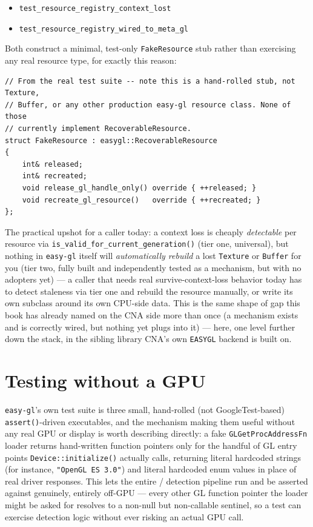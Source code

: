 \begin{itemize}
  \item \texttt{test\_resource\_registry\_context\_lost}
  \item \texttt{test\_resource\_registry\_wired\_to\_meta\_gl}
\end{itemize}

Both construct a minimal, test-only \texttt{FakeResource} stub rather than exercising any
real resource type, for exactly this reason:

\begin{lstlisting}
// From the real test suite -- note this is a hand-rolled stub, not Texture,
// Buffer, or any other production easy-gl resource class. None of those
// currently implement RecoverableResource.
struct FakeResource : easygl::RecoverableResource
{
    int& released;
    int& recreated;
    void release_gl_handle_only() override { ++released; }
    void recreate_gl_resource()   override { ++recreated; }
};
\end{lstlisting}

The practical upshot for a caller today: a context loss is cheaply \emph{detectable} per
resource via \texttt{is\_valid\_for\_current\_generation()} (tier one, universal), but nothing
in \texttt{easy-gl} itself will \emph{automatically rebuild} a lost \texttt{Texture} or
\texttt{Buffer} for you (tier two, fully built and independently tested as a mechanism, but with
no adopters yet) --- a caller that needs real survive-context-loss behavior today has to detect
staleness via tier one and rebuild the resource manually, or write its own
 subclass around its own CPU-side data. This is the same shape of
gap this book has already named on the CNA side more than once (a mechanism exists and is
correctly wired, but nothing yet plugs into it) --- here, one level further down the stack, in
the sibling library CNA's own \texttt{EASYGL} backend is built on.

\section{Testing without a GPU}

\texttt{easy-gl}'s own test suite is three small, hand-rolled (not GoogleTest-based)
\texttt{assert()}-driven executables, and the mechanism making them useful without any real
GPU or display is worth describing directly: a fake \texttt{GLGetProcAddressFn} loader
returns hand-written function pointers only for the handful of GL entry points
\texttt{Device::initialize()} actually calls, returning literal hardcoded strings (for
instance, \texttt{"OpenGL ES 3.0"}) and literal hardcoded enum values in place of real driver
responses. This lets the entire  /  detection
pipeline run and be asserted against genuinely, entirely off-GPU --- every other GL function
pointer the loader might be asked for resolves to a non-null but non-callable sentinel, so a
test can exercise detection logic without ever risking an actual GPU call.

